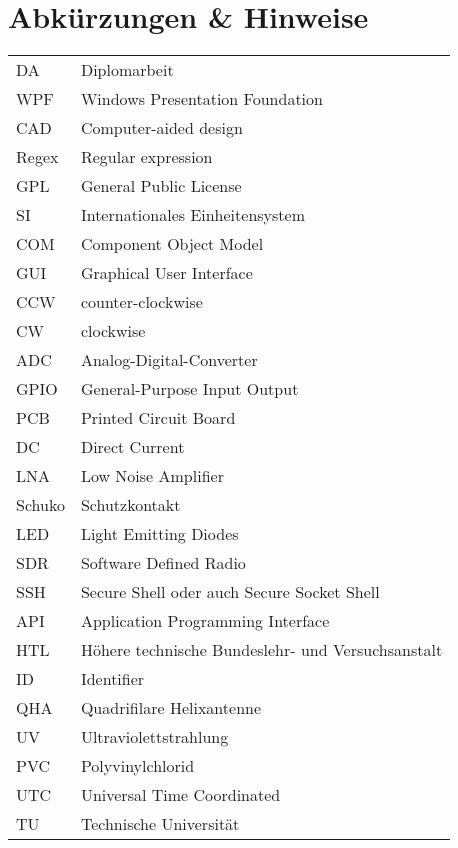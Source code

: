 \section*{Abkürzungen \& Hinweise}
\begin{singlespace}
	\begin{tabular}{ll}
		DA     & Diplomarbeit \\
		WPF    & Windows Presentation Foundation \\
		CAD    & Computer-aided design \\
		Regex  & Regular expression \\
		GPL    & General Public License  \\
		SI     & Internationales Einheitensystem \\
		COM    & Component Object Model \\
		GUI    & Graphical User Interface \\
		CCW	   & counter-clockwise \\
		CW     & clockwise \\
		ADC	   & Analog-Digital-Converter \\
		GPIO   & General-Purpose Input Output \\
		PCB	   & Printed Circuit Board \\
		DC     & Direct Current \\
		LNA    & Low Noise Amplifier \\
		Schuko & Schutzkontakt \\
		LED	   & Light Emitting Diodes \\
		SDR    & Software Defined Radio \\
		SSH    & Secure Shell oder auch Secure Socket Shell \\
		API    & Application Programming Interface \\
		HTL    & Höhere technische Bundeslehr- und Versuchsanstalt \\
		ID     & Identifier \\
		QHA    & Quadrifilare Helixantenne \\
		UV     & Ultraviolettstrahlung \\
		PVC    & Polyvinylchlorid \\
		UTC    & Universal Time Coordinated \\
		TU     & Technische Universität \\
	\end{tabular}
\end{singlespace}

\pagebreak
